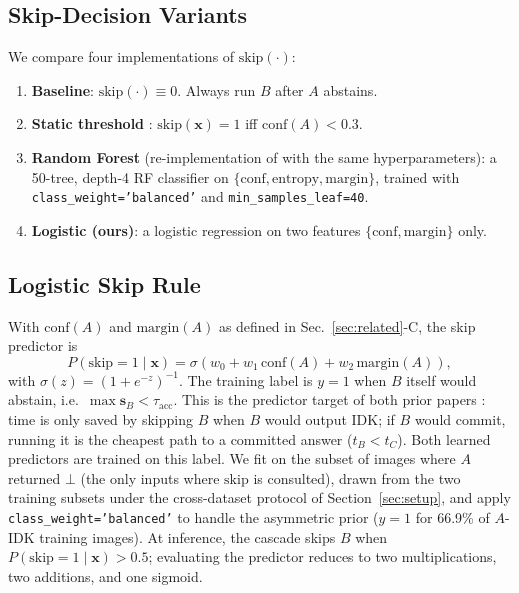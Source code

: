 \documentclass[conference]{IEEEtran}
\begin{document}
\subsection{Skip-Decision Variants}
We compare four implementations of $\mathrm{skip}(\cdot)$:
\begin{enumerate}
    \item \textbf{Baseline}: $\mathrm{skip}(\cdot) \equiv 0$. Always run $B$ after $A$ abstains.
    \item \textbf{Static threshold} \cite{nguyen2024probabilistic}: $\mathrm{skip}(\mathbf{x}) = 1$ iff $\mathrm{conf}(A) < 0.3$.
    \item \textbf{Random Forest} (re-implementation of \cite{katikaneni2025randomforest} with the same hyperparameters): a 50-tree, depth-4 RF classifier on $\{\text{conf}, \text{entropy}, \text{margin}\}$, trained with \texttt{class\_weight='balanced'} and \texttt{min\_samples\_leaf=40}.
    \item \textbf{Logistic (ours)}: a logistic regression on two features $\{\text{conf}, \text{margin}\}$ only.
\end{enumerate}

\subsection{Logistic Skip Rule}
With $\mathrm{conf}(A)$ and $\mathrm{margin}(A)$ as defined in Sec.~\ref{sec:related}-C, the skip predictor is
\[
P(\mathrm{skip}=1 \mid \mathbf{x}) = \sigma\!\left(w_0 + w_1\,\mathrm{conf}(A) + w_2\,\mathrm{margin}(A)\right),
\]
with $\sigma(z) = (1 + e^{-z})^{-1}$. The training label is $y = 1$ when $B$ itself would abstain, i.e.\ $\max \mathbf{s}_B < \tau_{\text{acc}}$. This is the predictor target of both prior papers \cite{nguyen2024probabilistic, katikaneni2025randomforest}: time is only saved by skipping $B$ when $B$ would output IDK; if $B$ would commit, running it is the cheapest path to a committed answer ($t_B < t_C$). Both learned predictors are trained on this label. We fit on the subset of images where $A$ returned $\bot$ (the only inputs where $\mathrm{skip}$ is consulted), drawn from the two training subsets under the cross-dataset protocol of Section~\ref{sec:setup}, and apply \texttt{class\_weight='balanced'} to handle the asymmetric prior ($y=1$ for 66.9\% of $A$-IDK training images). At inference, the cascade skips $B$ when $P(\mathrm{skip}=1\mid \mathbf{x}) > 0.5$; evaluating the predictor reduces to two multiplications, two additions, and one sigmoid.
\end{document}
